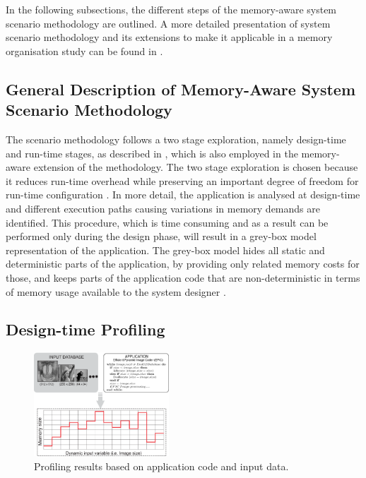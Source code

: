 \documentclass[a4paper,conference]{IEEEtran}
\begin{document}
In the following subsections, the different steps of the memory-aware system scenario methodology are outlined. A more detailed presentation of system scenario methodology and its extensions to make it applicable in a memory organisation study can be found in \cite{Fil12}.

\subsection{General Description of Memory-Aware System Scenario Methodology}

The scenario methodology follows a two stage exploration, namely design-time and run-time stages, as described in \cite{Gheorghita2007}, which is also employed in the memory-aware extension of the methodology. The two stage exploration is chosen because it reduces run-time overhead while preserving an important degree of freedom for run-time configuration \cite{tcm}. In more detail, the application is analysed at design-time and different execution paths causing variations in memory demands are identified. This procedure, which is time consuming and as a result can be performed only during the design phase, will result in a grey-box model representation of the application. The grey-box model hides all static and deterministic parts of the application, by providing only related memory costs for those, and keeps parts of the application code that are non-deterministic in terms of memory usage available to the system designer \cite{graybox}. 


\subsection{Design-time Profiling}

\begin{figure}[!t]
\centering
\includegraphics[width=0.45\textwidth]{Images/profiling2.eps}
\caption{Profiling results based on application code and input data.}
\label{fig:profiling}
\end{figure}
\end{document}
